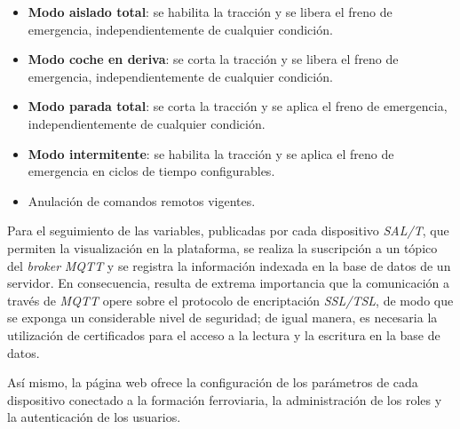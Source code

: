 \begin{itemize}

	\item \textbf{Modo aislado total}: se habilita la tracción y se libera el freno de emergencia, independientemente de cualquier condición. 

    \item \textbf{Modo coche en deriva}: se corta la tracción y se libera el freno de emergencia, independientemente de cualquier condición. 

    \item \textbf{Modo parada total}: se corta la tracción y se aplica el freno de emergencia, independientemente de cualquier condición. 
    
    \item \textbf{Modo intermitente}: se habilita la tracción y se aplica el freno de emergencia en ciclos de tiempo configurables. 

    \item Anulación de comandos remotos vigentes.

\end{itemize}


Para el seguimiento de las variables, publicadas por cada dispositivo \textit{SAL/T}, que permiten la visualización en la plataforma, se realiza la suscripción a un tópico del \textit{broker} \textit{MQTT} y se registra la información indexada en la base de datos de un servidor. En consecuencia, resulta de extrema importancia que la comunicación a través de \textit{MQTT} opere sobre el protocolo de encriptación \textit{SSL/TSL}, de modo que se exponga un considerable nivel de seguridad; de igual manera, es necesaria la utilización de certificados para el acceso a la lectura y la escritura en la base de datos.  

Así mismo, la página web ofrece la configuración de los parámetros de cada dispositivo conectado a la formación ferroviaria, la administración de los roles y la autenticación de los usuarios.

